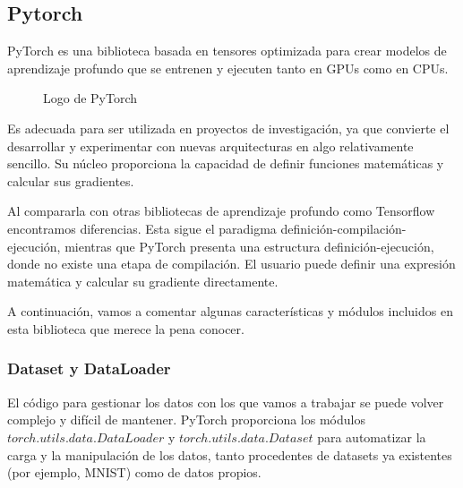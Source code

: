 \subsection{Pytorch}
PyTorch es una biblioteca basada en tensores optimizada para crear modelos de aprendizaje profundo que se entrenen y ejecuten tanto en GPUs como en CPUs.

\begin{figure}[H]
\centering
    \caption{Logo de PyTorch}
\end{figure}

Es adecuada para ser utilizada en proyectos de investigación, ya que convierte el desarrollar y experimentar con nuevas arquitecturas en algo relativamente sencillo. Su núcleo proporciona la capacidad de definir funciones matemáticas y calcular sus gradientes.

Al compararla con otras bibliotecas de aprendizaje profundo como Tensorflow encontramos diferencias. Esta sigue el paradigma definición-compilación-ejecución, mientras que PyTorch presenta una estructura definición-ejecución, donde no existe una etapa de compilación. El usuario puede definir una expresión matemática y calcular su gradiente directamente. \cite{ketkar2017introduction}

A continuación, vamos a comentar algunas características y módulos incluidos en esta biblioteca que merece la pena conocer.

\subsubsection{Dataset y DataLoader}
El código para gestionar los datos con los que vamos a trabajar se puede volver complejo y difícil de mantener. PyTorch proporciona los módulos $torch.utils.data.DataLoader$ y $torch.utils.data.Dataset$ para automatizar la carga y la manipulación de los datos, tanto procedentes de datasets ya existentes (por ejemplo, MNIST) como de datos propios.


